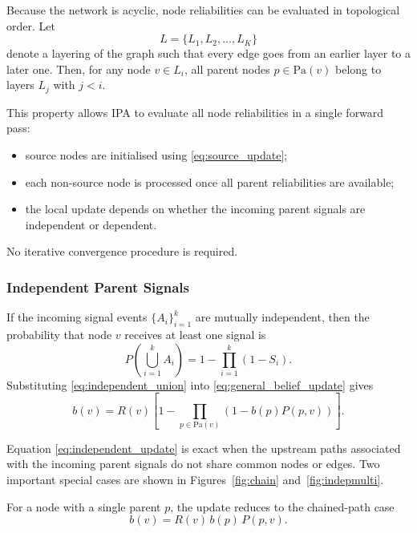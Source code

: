 \documentclass[preprint,12pt]{elsarticle}
\begin{document}
Because the network is acyclic, node reliabilities can be evaluated in topological order. Let
\[
L = \{L_1, L_2, \ldots, L_K\}
\]
denote a layering of the graph such that every edge goes from an earlier layer to a later one. Then, for any node $v \in L_i$, all parent nodes $p \in \text{Pa}(v)$ belong to layers $L_j$ with $j < i$.

This property allows IPA to evaluate all node reliabilities in a single forward pass:
\begin{itemize}
    \item source nodes are initialised using \eqref{eq:source_update};
    \item each non-source node is processed once all parent reliabilities are available;
    \item the local update depends on whether the incoming parent signals are independent or dependent.
\end{itemize}

No iterative convergence procedure is required.

\subsubsection{Independent Parent Signals}

If the incoming signal events $\{A_i\}_{i=1}^{k}$ are mutually independent, then the probability that node $v$ receives at least one signal is
\begin{equation}
P\left(\bigcup_{i=1}^{k} A_i\right)
= 1 - \prod_{i=1}^{k}(1-S_i).
\label{eq:independent_union}
\end{equation}
Substituting \eqref{eq:independent_union} into \eqref{eq:general_belief_update} gives
\begin{equation}
b(v) = R(v)\left[1-\prod_{p \in \text{Pa}(v)}\left(1-b(p)P(p,v)\right)\right].
\label{eq:independent_update}
\end{equation}

Equation \eqref{eq:independent_update} is exact when the upstream paths associated with the incoming parent signals do not share common nodes or edges. Two important special cases are shown in Figures~\ref{fig:chain} and~\ref{fig:indepmulti}.

For a node with a single parent $p$, the update reduces to the chained-path case
\begin{equation}
b(v) = R(v)\,b(p)\,P(p,v).
\label{eq:single_parent_update}
\end{equation}
\end{document}
